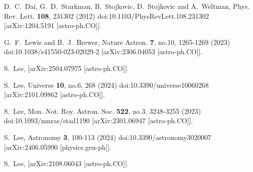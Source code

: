 \documentclass[jkps,preprint,fleqn]{revtex4} %
\begin{document}
\begin{thebibliography}{999}
D.~C.~Dai, G.~D.~Starkman, B.~Stojkovic, D.~Stojkovic and A.~Weltman,
Phys. Rev. Lett. \textbf{108}, 231302 (2012)
doi:10.1103/PhysRevLett.108.231302
[arXiv:1204.5191 [astro-ph.CO]].

G.~F.~Lewis and B.~J.~Brewer,
Nature Astron. \textbf{7}, no.10, 1265-1269 (2023)
doi:10.1038/s41550-023-02029-2
[arXiv:2306.04053 [astro-ph.CO]].


S.~Lee,
[arXiv:2504.07975 [astro-ph.CO]].


S.~Lee,
Universe \textbf{10}, no.6, 268 (2024)
doi:10.3390/universe10060268
[arXiv:2101.09862 [astro-ph.CO]].

S.~Lee,
Mon. Not. Roy. Astron. Soc. \textbf{522}, no.3, 3248-3255 (2023)
doi:10.1093/mnras/stad1190
[arXiv:2301.06947 [astro-ph.CO]].

S.~Lee,
Astronomy \textbf{3}, 100-113 (2024)
doi:10.3390/astronomy3020007
[arXiv:2406.05990 [physics.gen-ph]].


S.~Lee,
[arXiv:2108.06043 [astro-ph.CO]].


\end{thebibliography}
\end{document}
